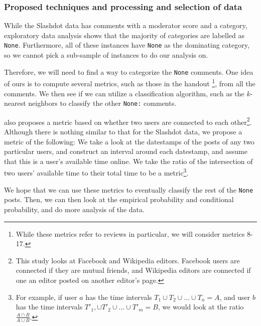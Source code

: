 \documentclass[a4paper,12pt]{article}
\numberwithin{equation}{section}
\begin{document}



\subsubsection*{Proposed techniques and processing and selection of data}

While the Slashdot data has comments with a moderator score and a category, exploratory data analysis shows that the majority of categories are labelled as {\tt None}. Furthermore, all of these instances have {\tt None} as the dominating category, so we cannot pick a sub-sample of instances to do our analysis on. 

Therefore, we will need to find a way to categorize the {\tt None} comments. One idea of ours is to compute several metrics, such as those in the handout \cite{Otterbacher}\footnote{While these metrics refer to reviews in particular, we will consider metrics 8-17.}, from all the comments. We then see if we can utilize a classification algorithm, such as the $k$-nearest neighbors to classify the other {\tt None:} comments.

\cite{Backstrom+al:13a} also proposes a metric based on whether two users are connected to each other\footnote{This study looks at Facebook and Wikipedia editors. Facebook users are connected if they are mutual friends, and Wikipedia editors are connected if one an editor posted on another editor's page.}. Although there is nothing similar to that for the Slashdot data, we propose a metric of the following: We take a look at the datestamps of the posts of any two particular users, and construct an interval around each datestamp, and assume that this is a user's available time online. We take the ratio of the intersection of two users' available time to their total time to be a metric\footnote{For example, if user $a$ has the time intervals $T_1 \cup T_2 \cup \hdots \cup T_n = A$, and user $b$ has the time intervals $T'_1, \cup T'_2 \cup \hdots \cup T'_m = B$, we would look at the ratio $\frac{A \cap B}{A \cup B}$. }. 

We hope that we can use these metrics to eventually classify the rest of the {\tt None} posts. Then, we can then look at the empirical probability and conditional probability, and do more analysis of the data.
\end{document}
